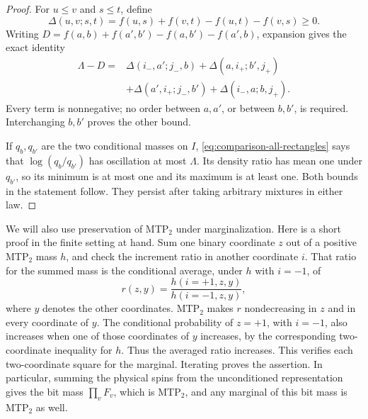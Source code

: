 \begin{proof}
For \(u\le v\) and \(s\le t\), define
\[
 \Delta(u,v;s,t)=f(u,s)+f(v,t)-f(u,t)-f(v,s)\ge0.
\]
Writing \(D=f(a,b)+f(a',b')-f(a,b')-f(a',b)\), expansion gives the exact
identity
\begin{align*}
 \Lambda-D={}&\Delta(i_-,a';j_-,b)
             +\Delta(a,i_+;b',j_+)\\
             &+\Delta(a',i_+;j_-,b')
             +\Delta(i_-,a;b,j_+).
\end{align*}
Every term is nonnegative; no order between \(a,a'\), or between
\(b,b'\), is required.  Interchanging \(b,b'\) proves the other bound.

If \(q_b,q_{b'}\) are the two conditional masses on \(I\),
\eqref{eq:comparison-all-rectangles} says that
\(\log(q_b/q_{b'})\) has oscillation at most \(\Lambda\).  Its density
ratio has mean one under \(q_{b'}\), so its minimum is at most one and
its maximum is at least one.  Both bounds in the statement follow.
They persist after taking arbitrary mixtures in either law.
\end{proof}

We will also use preservation of MTP\(_2\) under marginalization.  Here
is a short proof in the finite setting at hand.  Sum one binary
coordinate \(z\) out of a positive MTP\(_2\) mass \(h\), and check the
increment ratio in another coordinate \(i\).  That ratio for the summed
mass is the conditional average, under \(h\) with \(i=-1\), of
\[
 r(z,y)=\frac{h(i=+1,z,y)}{h(i=-1,z,y)},
\]
where \(y\) denotes the other coordinates.  MTP\(_2\) makes \(r\)
nondecreasing in \(z\) and in every coordinate of \(y\).  The
conditional probability of \(z=+1\), with \(i=-1\), also increases when
one of those coordinates of \(y\) increases, by the corresponding
two-coordinate inequality for \(h\).  Thus the averaged ratio
increases.  This verifies each two-coordinate square for the marginal.
Iterating proves the assertion.  In particular, summing the physical
spins from the unconditioned representation gives the bit mass
\(\prod_vF_v\), which is MTP\(_2\), and any marginal of this bit mass
is MTP\(_2\) as well.

